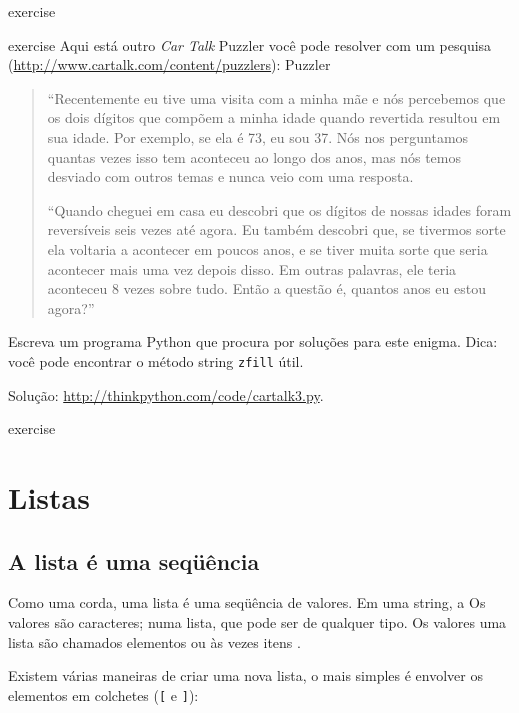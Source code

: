 \documentclass[10pt]{book}
\begin{document}
\begin{exercise}
\begin{}
\end{} exercise


\begin{} exercise
Aqui está outro {\em Car Talk} Puzzler você pode resolver com um
pesquisa (\url{http://www.cartalk.com/content/puzzlers}):
\index{} Puzzler

\begin{quote}
``Recentemente eu tive uma visita com a minha mãe e nós percebemos que
os dois dígitos que compõem a minha idade quando revertida resultou em sua
idade. Por exemplo, se ela é 73, eu sou 37. Nós nos perguntamos quantas vezes isso tem
aconteceu ao longo dos anos, mas nós temos desviado com outros temas e
nunca veio com uma resposta.

``Quando cheguei em casa eu descobri que os dígitos de nossas idades foram
reversíveis seis vezes até agora. Eu também descobri que, se tivermos sorte ela
voltaria a acontecer em poucos anos, e se tiver muita sorte que seria
acontecer mais uma vez depois disso. Em outras palavras, ele teria
aconteceu 8 vezes sobre tudo. Então a questão é, quantos anos eu estou agora?''

\end{quote}

Escreva um programa Python que procura por soluções para este enigma.
Dica: você pode encontrar o método string {\tt zfill} útil.

Solução: \url{http://thinkpython.com/code/cartalk3.py}.

\end{} exercise



\chapter{Listas}

\section{A lista é uma seqüência}
\label{seqüência}

Como uma corda, uma lista {\bf} é uma seqüência de valores. Em uma string, a
Os valores são caracteres; numa lista, que pode ser de qualquer tipo. Os valores
uma lista são chamados elementos {\bf} ou às vezes {itens \bf}.

Existem várias maneiras de criar uma nova lista, o mais simples é
envolver os elementos em colchetes (\verb "[" e \verb "]"):


\end{exercise}
\end{document}
